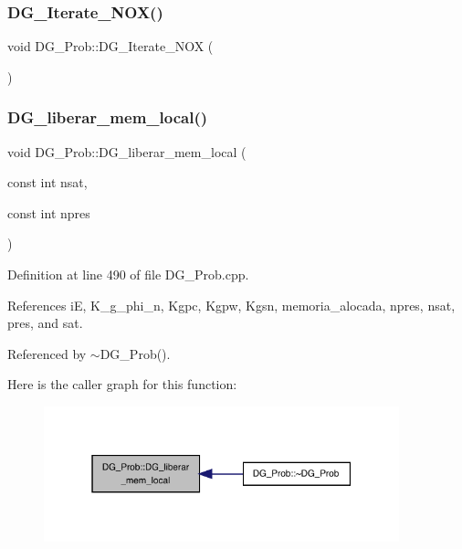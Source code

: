 \subsubsection{\texorpdfstring{D\+G\+\_\+\+Iterate\+\_\+\+N\+O\+X()}{DG\_Iterate\_NOX()}}
{\footnotesize\ttfamily void D\+G\+\_\+\+Prob\+::\+D\+G\+\_\+\+Iterate\+\_\+\+N\+OX (\begin{DoxyParamCaption}{ }\end{DoxyParamCaption})}

\mbox{\label{classDG__Prob_a06e10d482a426f07f66be721dbc4bb88}} 
\subsubsection{\texorpdfstring{D\+G\+\_\+liberar\+\_\+mem\+\_\+local()}{DG\_liberar\_mem\_local()}}
{\footnotesize\ttfamily void D\+G\+\_\+\+Prob\+::\+D\+G\+\_\+liberar\+\_\+mem\+\_\+local (\begin{DoxyParamCaption}\item[{const int}]{nsat,  }\item[{const int}]{npres }\end{DoxyParamCaption})}



Definition at line 490 of file D\+G\+\_\+\+Prob.\+cpp.



References iE, K\+\_\+g\+\_\+phi\+\_\+n, Kgpc, Kgpw, Kgsn, memoria\+\_\+alocada, npres, nsat, pres, and sat.



Referenced by $\sim$\+D\+G\+\_\+\+Prob().

Here is the caller graph for this function\+:
\nopagebreak
\begin{figure}[H]
\begin{center}
\leavevmode
\includegraphics[width=292pt]{classDG__Prob_a06e10d482a426f07f66be721dbc4bb88_icgraph}
\end{center}
\end{figure}
\mbox{\label{classDG__Prob_a68ffd2ab09f51c7b29b88b006fbc5c49}} 
